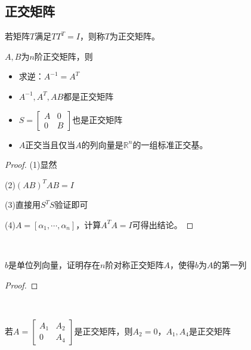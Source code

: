 \subsection{正交矩阵}

\begin{definition}[正交矩阵]
  若矩阵$T$满足$TT^T = I$，则称$T$为正交矩阵。
\end{definition}

\begin{theorem}[正交矩阵的性质]
  $A,B$为$n$阶正交矩阵，则
  \begin{itemize}
  \item 求逆：$A^{-1} = A^T$
  \item $A^{-1},A^T, AB$都是正交矩阵
  \item $S = \left[
      \begin{array}{cc}
        A&0\\
        0&B
      \end{array}
    \right]$也是正交矩阵
  \item $A$正交当且仅当$A$的列向量是$\mathbb{R}^n$的一组标准正交基。
  \end{itemize}
\end{theorem}

\begin{proof}
  (1)显然

  (2)$(AB)^TAB = I$

  (3)直接用$S^TS$验证即可

  (4)$A = [\alpha_1,\cdots,\alpha_n]$，计算$A^TA = I$可得出结论。
\end{proof}

~

\begin{exercise}[正交矩阵练习]
  $b$是单位列向量，证明存在$n$阶对称正交矩阵$A$，使得$b$为$A$的第一列
\end{exercise}

\begin{proof}
  
\end{proof}


~

\begin{theorem}[分块上三角正交矩阵]
  若$A = \left[
    \begin{array}{cc}
      A_1&A_2\\
      0&A_4
    \end{array}
  \right]$是正交矩阵，则$A_2 = 0$，$A_1,A_4$是正交矩阵
\end{theorem}

